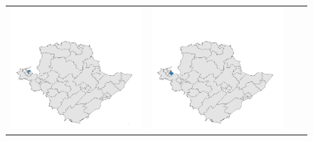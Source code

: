 \begin{figure}[p]
\begin{tabularx}{1\textwidth}{XXXX}
\includegraphics[width=1\linewidth]{images/ch6/mergeoverall/01}&
\includegraphics[width=1\linewidth]{images/ch6/mergeoverall/02}&

\end{tabularx}
\end{figure}
